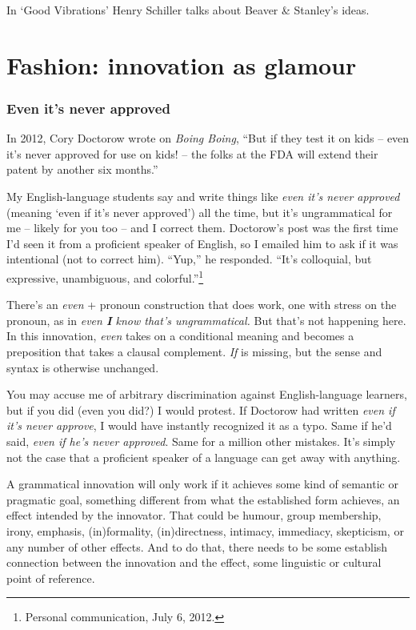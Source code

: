 In ‘Good Vibrations’ Henry Schiller talks about Beaver \& Stanley's ideas.

\section{Fashion: innovation as glamour}



\subsubsection{Even it's never approved}

In 2012, Cory Doctorow wrote on \textit{Boing Boing}, ``But if they test it on kids -- even it's never approved for use on kids! -- the folks at the FDA will extend their patent by another six months.''

My English-language students say and write things like \textit{even it's never approved} (meaning `even if it's never approved') all the time, but it's ungrammatical for me -- likely for you too -- and I correct them. Doctorow's post was the first time I'd seen it from a proficient speaker of English, so I emailed him to ask if it was intentional (not to correct him). ``Yup,'' he responded. ``It's colloquial, but expressive, unambiguous, and colorful.''\footnote{Personal communication, July 6, 2012.}

There's an \textit{even} + pronoun construction that does work, one with stress on the pronoun, as in \textit{even \textbf{I} know that's ungrammatical.} But that's not happening here. In this innovation, \textit{even} takes on a conditional meaning and becomes a preposition that takes a clausal complement. \textit{If} is missing, but the sense and syntax is otherwise unchanged.

You may accuse me of arbitrary discrimination against English-language learners, but if you did (even you did?) I would protest. If Doctorow had written \textit{even if it's never approve}, I would have instantly recognized it as a typo. Same if he'd said, \textit{even if he's never approved}. Same for a million other mistakes. It's simply not the case that a proficient speaker of a language can get away with anything.

A grammatical innovation will only work if it achieves some kind of semantic or pragmatic goal, something different from what the established form achieves, an effect intended by the innovator. That could be humour, group membership, irony, emphasis, (in)formality, (in)directness, intimacy, immediacy, skepticism, or any number of other effects. And to do that, there needs to be some establish connection between the innovation and the effect, some linguistic or cultural point of reference.

